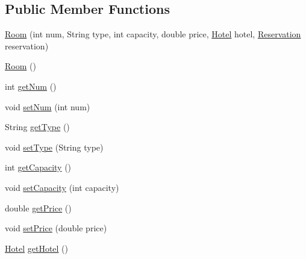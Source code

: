 \subsection*{Public Member Functions}
\begin{DoxyCompactItemize}
\item 
\mbox{\hyperlink{classbspq18__e4_1_1_gestion_hotelera_1_1server_1_1data_1_1_room_abbb03f3a42b6e7d67d66335d7230d888}{Room}} (int num, String type, int capacity, double price, \mbox{\hyperlink{classbspq18__e4_1_1_gestion_hotelera_1_1server_1_1data_1_1_hotel}{Hotel}} hotel, \mbox{\hyperlink{classbspq18__e4_1_1_gestion_hotelera_1_1server_1_1data_1_1_reservation}{Reservation}} reservation)
\item 
\mbox{\hyperlink{classbspq18__e4_1_1_gestion_hotelera_1_1server_1_1data_1_1_room_ac3ade520b32f5d78138eba909d1646a5}{Room}} ()
\item 
int \mbox{\hyperlink{classbspq18__e4_1_1_gestion_hotelera_1_1server_1_1data_1_1_room_a1d66ab0c9a1a506ce5f413e7602f11c9}{get\+Num}} ()
\item 
void \mbox{\hyperlink{classbspq18__e4_1_1_gestion_hotelera_1_1server_1_1data_1_1_room_ac8788422f55cfe5f24e3381b5e71bc68}{set\+Num}} (int num)
\item 
String \mbox{\hyperlink{classbspq18__e4_1_1_gestion_hotelera_1_1server_1_1data_1_1_room_a78ff22309b47e89c291ea0239971557b}{get\+Type}} ()
\item 
void \mbox{\hyperlink{classbspq18__e4_1_1_gestion_hotelera_1_1server_1_1data_1_1_room_ae5c00383127f5e36610d77f97aebf8b0}{set\+Type}} (String type)
\item 
int \mbox{\hyperlink{classbspq18__e4_1_1_gestion_hotelera_1_1server_1_1data_1_1_room_a0ddc1c5c3828b19d8a666c8485b8cbef}{get\+Capacity}} ()
\item 
void \mbox{\hyperlink{classbspq18__e4_1_1_gestion_hotelera_1_1server_1_1data_1_1_room_a635cec777d7c3038fa58456703ab2903}{set\+Capacity}} (int capacity)
\item 
double \mbox{\hyperlink{classbspq18__e4_1_1_gestion_hotelera_1_1server_1_1data_1_1_room_a28962e2a56bc81698b140c2fd6ecffaa}{get\+Price}} ()
\item 
void \mbox{\hyperlink{classbspq18__e4_1_1_gestion_hotelera_1_1server_1_1data_1_1_room_a72f5acb84aaf232077b6f791a600d7e7}{set\+Price}} (double price)
\item 
\mbox{\hyperlink{classbspq18__e4_1_1_gestion_hotelera_1_1server_1_1data_1_1_hotel}{Hotel}} \mbox{\hyperlink{classbspq18__e4_1_1_gestion_hotelera_1_1server_1_1data_1_1_room_a848985afb34ee48ceda98d850c43d252}{get\+Hotel}} ()

\end{DoxyCompactItemize}
